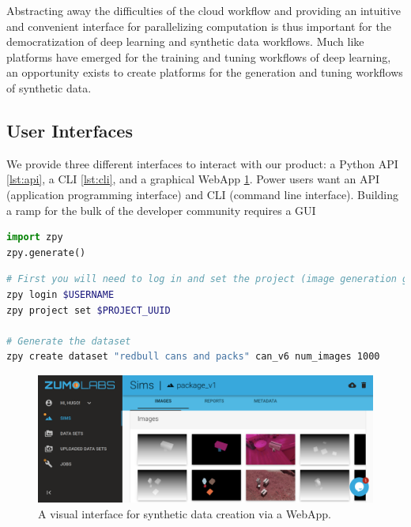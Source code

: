 \documentclass{article}
\begin{document}
Abstracting away the difficulties of the cloud workflow and providing an intuitive and convenient interface for parallelizing computation is thus important for the democratization of deep learning and synthetic data workflows. Much like platforms have emerged for the training and tuning workflows of deep learning, an opportunity exists to create platforms for the generation and tuning workflows of synthetic data.

\subsection{User Interfaces}
\label{sec:userinterfaces}

We provide three different interfaces to interact with our product: a Python API \ref{lst:api}, a CLI \ref{lst:cli}, and a graphical WebApp \ref{fig:webapp}. Power users want an API (application programming interface) and CLI (command line interface). Building a ramp for the bulk of the developer community requires a GUI

\begin{lstlisting}[language=Python,caption={Generating a dataset using the zpy python API.},label={lst:api}]
import zpy
zpy.generate()
\end{lstlisting}

\begin{lstlisting}[language=bash,caption={Generating a dataset using the zpy CLI},label={lst:cli}]
# First you will need to log in and set the project (image generation gets billed according to project)
zpy login $USERNAME 
zpy project set $PROJECT_UUID

# Generate the dataset
zpy create dataset "redbull cans and packs" can_v6 num_images 1000
\end{lstlisting}

\begin{figure}
	\centering
	\includegraphics[width=\textwidth]{webapp.png}
	\caption{A visual interface for synthetic data creation via a WebApp.}
	\label{fig:webapp}
\end{figure}
\end{document}

